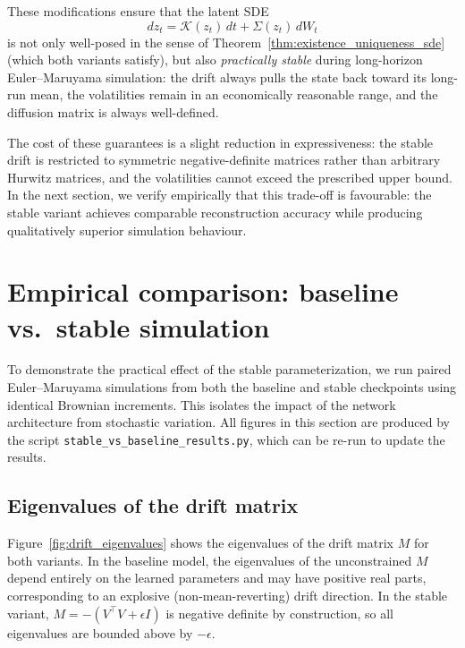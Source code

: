 These modifications ensure that the latent SDE
\[
dz_t = \mathcal{K}(z_t)\,dt + \Sigma(z_t)\,dW_t
\]
is not only well-posed in the sense of Theorem~\ref{thm:existence_uniqueness_sde} (which both variants satisfy), but also \emph{practically stable} during long-horizon Euler--Maruyama simulation: the drift always pulls the state back toward its long-run mean, the volatilities remain in an economically reasonable range, and the diffusion matrix is always well-defined.

The cost of these guarantees is a slight reduction in expressiveness: the stable drift is restricted to symmetric negative-definite matrices rather than arbitrary Hurwitz matrices, and the volatilities cannot exceed the prescribed upper bound.
In the next section, we verify empirically that this trade-off is favourable: the stable variant achieves comparable reconstruction accuracy while producing qualitatively superior simulation behaviour.


\section{Empirical comparison: baseline vs.\ stable simulation}
\label{sec:stable_empirical}

To demonstrate the practical effect of the stable parameterization, we run paired Euler--Maruyama simulations from both the baseline and stable checkpoints using identical Brownian increments.
This isolates the impact of the network architecture from stochastic variation.
All figures in this section are produced by the script \texttt{stable\_vs\_baseline\_results.py}, which can be re-run to update the results.


\subsection{Eigenvalues of the drift matrix}

Figure~\ref{fig:drift_eigenvalues} shows the eigenvalues of the drift matrix $M$ for both variants.
In the baseline model, the eigenvalues of the unconstrained $M$ depend entirely on the learned parameters and may have positive real parts, corresponding to an explosive (non-mean-reverting) drift direction.
In the stable variant, $M = -(V^\top V + \epsilon I)$ is negative definite by construction, so all eigenvalues are bounded above by $-\epsilon$.

